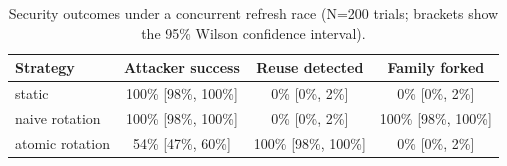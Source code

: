 \begin{table}[htbp]
\centering
\caption{Security outcomes under a concurrent refresh race (N=200 trials; brackets show the 95\% Wilson confidence interval).}
\label{tab:main-results}
\begin{tabular}{lccc}
\toprule
Strategy & Attacker success & Reuse detected & Family forked \\
\midrule
static & 100\% [98\%, 100\%] & 0\% [0\%, 2\%] & 0\% [0\%, 2\%] \\
naive rotation & 100\% [98\%, 100\%] & 0\% [0\%, 2\%] & 100\% [98\%, 100\%] \\
atomic rotation & 54\% [47\%, 60\%] & 100\% [98\%, 100\%] & 0\% [0\%, 2\%] \\
\bottomrule
\end{tabular}
\end{table}
